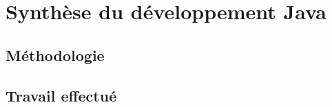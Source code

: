 \section{Synthèse du développement Java}
\label{sec:synthese_java}

\subsection{Méthodologie}
\subsection{Travail effectué}
